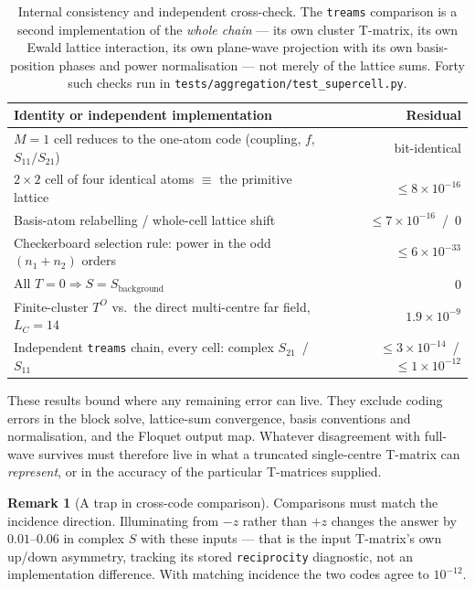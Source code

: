 \documentclass[11pt,a4paper]{article}
\newcommand{\code}[1]{\texttt{\small #1}}
\theoremstyle{plain}
\theoremstyle{definition}
\newtheorem{remark}{Remark}
\begin{document}
\begin{table}[htbp]
\centering\small
\caption{Internal consistency and independent cross-check. The \texttt{treams}
comparison is a second implementation of the \emph{whole chain} --- its own
cluster T-matrix, its own Ewald lattice interaction, its own plane-wave
projection with its own basis-position phases and power normalisation --- not
merely of the lattice sums. Forty such checks run in
\code{tests/aggregation/test\_supercell.py}.}
\label{tab:identities}
\begin{tabular}{@{}lr@{}}
\toprule
Identity or independent implementation & Residual \\
\midrule
$M = 1$ cell reduces to the one-atom code (coupling, $f$, $S_{11}/S_{21}$)
  & \textcolor{good}{bit-identical} \\
$2\times2$ cell of four identical atoms $\equiv$ the primitive lattice
  & \textcolor{good}{$\le 8\times10^{-16}$} \\
Basis-atom relabelling / whole-cell lattice shift
  & \textcolor{good}{$\le 7\times10^{-16}$ \,/\, $0$} \\
Checkerboard selection rule: power in the odd $(n_1{+}n_2)$ orders
  & \textcolor{good}{$\le 6\times10^{-33}$} \\
All $T = 0 \Rightarrow S = S_{\text{background}}$
  & \textcolor{good}{$0$} \\
Finite-cluster $T^{O}$ vs.\ the direct multi-centre far field, $L_C = 14$
  & \textcolor{good}{$1.9\times10^{-9}$} \\
Independent \texttt{treams} chain, every cell: complex $S_{21}$ \,/\, $S_{11}$
  & \textcolor{good}{$\le 3\times10^{-14}$ \,/\, $\le 1\times10^{-12}$} \\
\bottomrule
\end{tabular}
\end{table}

These results bound where any remaining error can live. They exclude coding
errors in the block solve, lattice-sum convergence, basis conventions and
normalisation, and the Floquet output map. Whatever disagreement with full-wave
survives must therefore live in what a truncated single-centre T-matrix can
\emph{represent}, or in the accuracy of the particular T-matrices supplied.

\begin{remark}[A trap in cross-code comparison]
Comparisons must match the incidence direction. Illuminating from $-z$ rather
than $+z$ changes the answer by $0.01$--$0.06$ in complex $S$ with these inputs
--- that is the input T-matrix's own up/down asymmetry, tracking its stored
\code{reciprocity} diagnostic, not an implementation difference. With matching
incidence the two codes agree to $10^{-12}$.
\end{remark}
\end{document}

